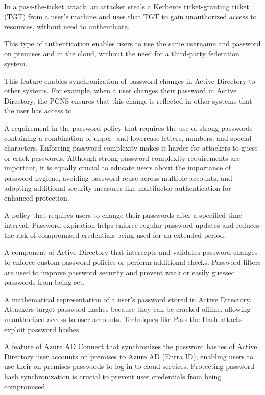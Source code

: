  In a pass-the-ticket attack, an attacker steals a Kerberos ticket-granting ticket (TGT) from a user’s machine and uses that TGT to gain unauthorized access to resources, without need to authenticate.

 This type of authentication enables users to use the same username and password on premises and in the cloud, without the need for a third-party federation system.

 This feature enables synchronization of password changes in Active Directory to other systems. For example, when a user changes their password in Active Directory, the PCNS ensures that this change is reflected in other systems that the user has access to.

 A requirement in the password policy that requires the use of strong passwords containing a combination of upper- and lowercase letters, numbers, and special characters. Enforcing password complexity makes it harder for attackers to guess or crack passwords. Although strong password complexity requirements are important, it is equally crucial to educate users about the importance of password hygiene, avoiding password reuse across multiple accounts, and adopting additional security measures like multifactor authentication for enhanced protection.

 A policy that requires users to change their passwords after a specified time interval. Password expiration helps enforce regular password updates and reduces the risk of compromised credentials being used for an extended period.

 A component of Active Directory that intercepts and validates password changes to enforce custom password policies or perform additional checks. Password filters are used to improve password security and prevent weak or easily guessed passwords from being set.

 A mathematical representation of a user’s password stored in Active Directory. Attackers target password hashes because they can be cracked offline, allowing unauthorized access to user accounts. Techniques like Pass-the-Hash attacks exploit password hashes.

 A feature of Azure AD Connect that synchronizes the password hashes of Active Directory user accounts on premises to Azure AD (Entra ID), enabling users to use their on premises passwords to log in to cloud services. Protecting password hash synchronization is crucial to prevent user credentials from being compromised.


